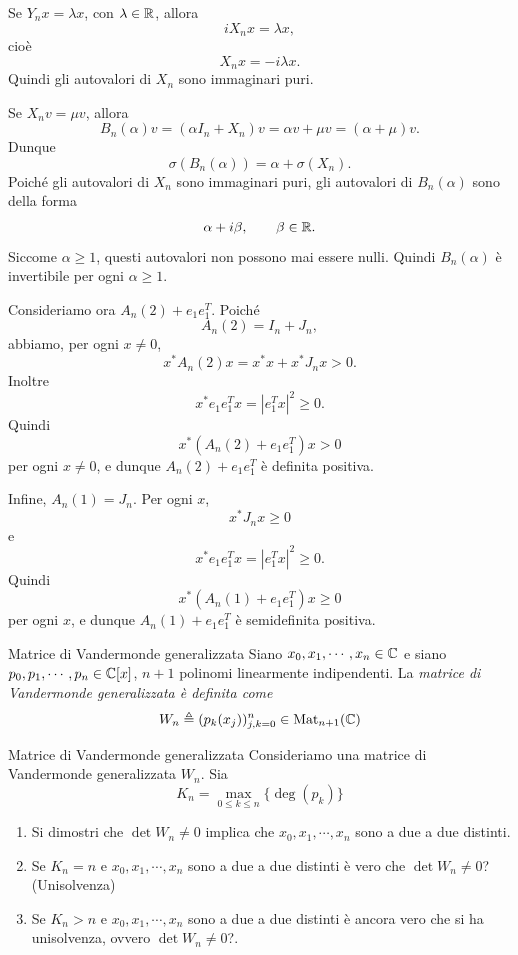 \documentclass[a4paper]{article}
\begin{document}
\begin{snippetsolution}{}
    Se \(Y_nx = \lambda x\), con \(\lambda \in \mathbb{R}\), allora
    \[
        iX_nx = \lambda x,
    \]
    cioè
    \[
        X_nx = -i\lambda x.
    \]
    Quindi gli autovalori di \(X_n\) sono immaginari puri.

    Se \(X_nv = \mu v\), allora
    \[
        B_n(\alpha)v = (\alpha I_n + X_n)v = \alpha v + \mu v = (\alpha+\mu)v.
    \]
    Dunque
    \[
        \sigma(B_n(\alpha)) = \alpha + \sigma(X_n).
    \]
    Poiché gli autovalori di \(X_n\) sono immaginari puri, gli autovalori di
    \(B_n(\alpha)\) sono della forma
    \[
        \alpha + i\beta,
        \qquad \beta \in \mathbb{R}.
    \]
    Siccome \(\alpha \geq 1\), questi autovalori non possono mai essere nulli.
    Quindi \(B_n(\alpha)\) è invertibile per ogni \(\alpha \geq 1\).

    Consideriamo ora \(A_n(2) + e_1e_1^T\). Poiché
    \[
        A_n(2) = I_n + J_n,
    \]
    abbiamo, per ogni \(x \neq 0\),
    \[
        x^*A_n(2)x = x^*x + x^*J_nx > 0.
    \]
    Inoltre
    \[
        x^*e_1e_1^Tx = |e_1^Tx|^2 \geq 0.
    \]
    Quindi
    \[
        x^*\left(A_n(2) + e_1e_1^T\right)x > 0
    \]
    per ogni \(x \neq 0\), e dunque \(A_n(2) + e_1e_1^T\) è definita positiva.

    Infine, \(A_n(1) = J_n\). Per ogni \(x\),
    \[
        x^*J_nx \geq 0
    \]
    e
    \[
        x^*e_1e_1^Tx = |e_1^Tx|^2 \geq 0.
    \]
    Quindi
    \[
        x^*\left(A_n(1) + e_1e_1^T\right)x \geq 0
    \]
    per ogni \(x\), e dunque \(A_n(1) + e_1e_1^T\) è semidefinita positiva.
\end{snippetsolution}

\begin{snippetdefinition}{Matrice di Vandermonde generalizzata}
    Siano \(x_0, x_1, \cdots, x_n \in \mathbb{C}\)
    e siano \(p_0, p_1, \cdots, p_n \in \mathbb{C}[x]\), \(n+1\) polinomi linearmente indipendenti.
    La \emph{matrice di Vandermonde generalizzata è definita come}
    \[
        W_n \triangleq (p_k(x_j))_{j,k=0}^n \in \operatorname{Mat}_{n+1}(\mathbb{C})
    \]
\end{snippetdefinition}

\begin{snippetexercise}{Matrice di Vandermonde generalizzata}
    Consideriamo una matrice di Vandermonde generalizzata \(W_n\).
    Sia \[
        K_n = \max_{0 \leq k \leq n} \{ \deg (p_k) \} %
    \]
    \begin{enumerate}
        \item Si dimostri che \(\det W_n \neq 0\)
            implica che \(x_0, x_1, \cdots, x_n\) sono a due a due distinti.
        \item Se \(K_n = n\) e \(x_0, x_1, \cdots, x_n\)
            sono a due a due distinti è vero che \(\det W_n \neq 0\)? (Unisolvenza)
        \item Se \(K_n > n\) e \(x_0, x_1, \cdots, x_n\)
            sono a due a due distinti è ancora vero che si ha unisolvenza,
            ovvero \(\det W_n \neq 0\)?.
    \end{enumerate}
\end{snippetexercise}
\end{document}
